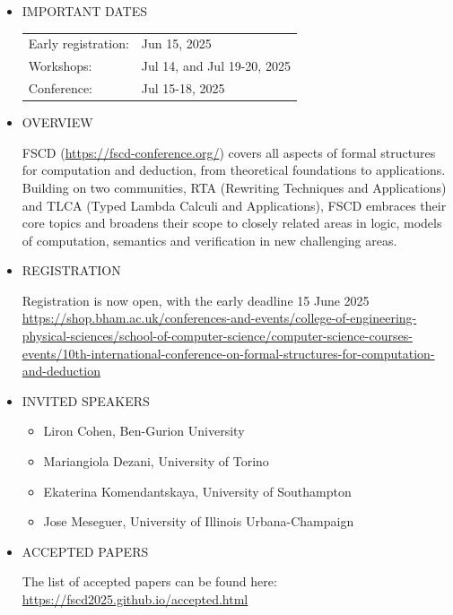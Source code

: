 \documentclass[prodmode,acmtecs]{acmsmall} %
\begin{document}
\begin{itemize}\item  IMPORTANT DATES 
 
\begin{tabulary}{\linewidth}{LL}Early registration:  & Jun 15, 2025 \\
Workshops:  & Jul 14, and Jul 19-20, 2025 \\
Conference:  & Jul 15-18, 2025 \\
\end{tabulary}
 
\item  OVERVIEW 
 
  FSCD (\href{https://fscd-conference.org/}{https://fscd-conference.org/}) covers all aspects of formal structures for computation and deduction, from theoretical foundations to applications. Building on two communities, RTA (Rewriting Techniques and Applications) and TLCA (Typed Lambda Calculi and Applications), FSCD embraces their core topics and broadens their scope to closely related areas in logic, models of computation, semantics and verification in new challenging areas. 
 
\item  REGISTRATION 
 
  Registration is now open, with the early deadline 15 June 2025 \href{https://shop.bham.ac.uk/conferences-and-events/college-of-engineering-physical-sciences/school-of-computer-science/computer-science-courses-events/10th-international-conference-on-formal-structures-for-computation-and-deduction}{https://shop.bham.ac.uk/conferences-and-events/college-of-engineering-physical-sciences/school-of-computer-science/computer-science-courses-events/10th-international-conference-on-formal-structures-for-computation-and-deduction} 
 
\item  INVITED SPEAKERS 
 
\begin{itemize}\item  Liron Cohen, Ben-Gurion University
\item  Mariangiola Dezani, University of Torino
\item  Ekaterina Komendantskaya, University of Southampton
\item  Jose Meseguer, University of Illinois Urbana-Champaign
\end{itemize} 
\item  ACCEPTED PAPERS 
 
  The list of accepted papers can be found here: \href{https://fscd2025.github.io/accepted.html}{https://fscd2025.github.io/accepted.html} 
 

\end{itemize}
\end{document}
